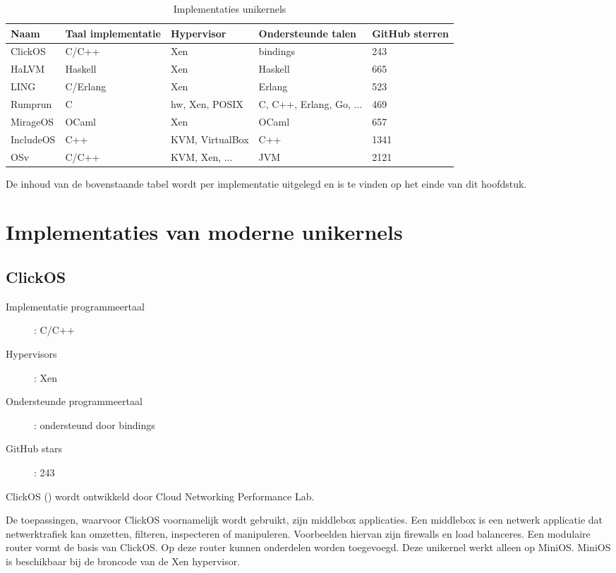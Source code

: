 \begin{sidewaystable}[ht]
\caption{Implementaties unikernels}
\begin{center}
    \begin{tabular}{| l | l | l | l | l |}
    \hline
    Naam & Taal implementatie & Hypervisor & Ondersteunde talen & GitHub sterren \\ \hline
    ClickOS & C/C++ & Xen & bindings & 243 \\ \hline
    HaLVM & Haskell & Xen & Haskell & 665 \\ \hline
    LING & C/Erlang & Xen & Erlang & 523 \\ \hline
    Rumprun & C & hw, Xen, POSIX & C, C++, Erlang, Go, ... & 469 \\ \hline
    MirageOS & OCaml & Xen & OCaml & 657 \\ \hline
    IncludeOS & C++ & KVM, VirtualBox & C++ & 1341 \\ \hline
    OSv & C/C++ & KVM, Xen, ... & JVM & 2121 \\ \hline
    \end{tabular}
\end{center}
\label{tab:impl_unikernels}
\end{sidewaystable}

De inhoud van de bovenstaande tabel wordt per implementatie uitgelegd en is te vinden op het einde van dit hoofdstuk.

\newpage

\section{Implementaties van moderne unikernels}

\subsection{ClickOS}
\begin{description}
  \item [Implementatie programmeertaal]: C/C++
  \item [Hypervisors]: Xen
  \item [Ondersteunde programmeertaal]: ondersteund door bindings
  \item [GitHub stars]: 243
\end{description}

ClickOS  (\cite{martins_clickos_2014}) wordt ontwikkeld door Cloud Networking Performance Lab.

De toepassingen, waarvoor ClickOS voornamelijk wordt gebruikt, zijn middlebox applicaties. Een middlebox is een netwerk applicatie dat netwerktrafiek kan omzetten, filteren, inspecteren of manipuleren. Voorbeelden hiervan zijn firewalls en load balanceres.
Een modulaire router vormt de basis van ClickOS. Op deze router kunnen onderdelen worden toegevoegd. Deze unikernel werkt alleen op MiniOS. MiniOS is beschikbaar bij de broncode van de Xen hypervisor.

